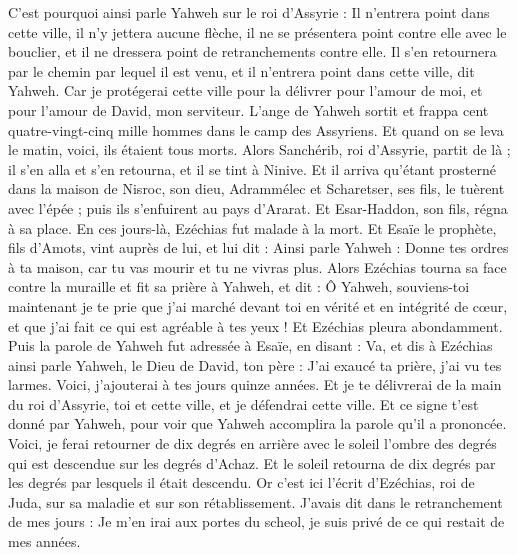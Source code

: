 \begin{multicols}{2}
C'est pourquoi ainsi parle Yahweh sur le roi d'Assyrie : Il n'entrera point dans cette ville, il n'y jettera aucune flèche, il ne se présentera point contre elle avec le bouclier, et il ne dressera point de retranchements contre elle.
Il s'en retournera par le chemin par lequel il est venu, et il n'entrera point dans cette ville, dit Yahweh.
Car je protégerai cette ville pour la délivrer pour l'amour de moi, et pour l'amour de David, mon serviteur.
L'ange de Yahweh sortit et frappa cent quatre-vingt-cinq mille hommes dans le camp des Assyriens. Et quand on se leva le matin, voici, ils étaient tous morts.
Alors Sanchérib, roi d'Assyrie, partit de là ; il s'en alla et s'en retourna, et il se tint à Ninive.
Et il arriva qu'étant prosterné dans la maison de Nisroc, son dieu, Adrammélec et Scharetser, ses fils, le tuèrent avec l'épée ; puis ils s'enfuirent au pays d'Ararat. Et Esar-Haddon, son fils, régna à sa place.
\VerseOne{}En ces jours-là, Ezéchias fut malade à la mort. Et Esaïe le prophète, fils d'Amots, vint auprès de lui, et lui dit : Ainsi parle Yahweh : Donne tes ordres à ta maison, car tu vas mourir et tu ne vivras plus.
Alors Ezéchias tourna sa face contre la muraille et fit sa prière à Yahweh,
et dit : Ô Yahweh, souviens-toi maintenant je te prie que j'ai marché devant toi en vérité et en intégrité de cœur, et que j'ai fait ce qui est agréable à tes yeux ! Et Ezéchias pleura abondamment.
Puis la parole de Yahweh fut adressée à Esaïe, en disant :
Va, et dis à Ezéchias ainsi parle Yahweh, le Dieu de David, ton père : J'ai exaucé ta prière, j'ai vu tes larmes. Voici, j'ajouterai à tes jours quinze années.
Et je te délivrerai de la main du roi d'Assyrie, toi et cette ville, et je défendrai cette ville.
Et ce signe t'est donné par Yahweh, pour voir que Yahweh accomplira la parole qu'il a prononcée.
Voici, je ferai retourner de dix degrés en arrière avec le soleil l'ombre des degrés qui est descendue sur les degrés d'Achaz. Et le soleil retourna de dix degrés par les degrés par lesquels il était descendu.
Or c'est ici l'écrit d'Ezéchias, roi de Juda, sur sa maladie et sur son rétablissement.
J'avais dit dans le retranchement de mes jours : Je m'en irai aux portes du scheol, je suis privé de ce qui restait de mes années.

\end{multicols}
